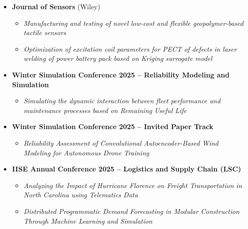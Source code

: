 \documentclass[10pt, letterpaper]{article}
\begin{document}
\begin{itemize}
    \item \textbf{Journal of Sensors} (Wiley)
    \begin{itemize}
        \item \textit{Manufacturing and testing of novel low-cost and flexible geopolymer-based tactile sensors}
        \item \textit{Optimization of excitation coil parameters for PECT of defects in laser welding of power battery pack based on Kriging surrogate model}
    \end{itemize}

    \item \textbf{Winter Simulation Conference 2025 – Reliability Modeling and Simulation}
    \begin{itemize}
        \item \textit{Simulating the dynamic interaction between fleet performance and maintenance processes based on Remaining Useful Life}
    \end{itemize}

    \item \textbf{Winter Simulation Conference 2025 – Invited Paper Track}
    \begin{itemize}
        \item \textit{Reliability Assessment of Convolutional Autoencoder-Based Wind Modeling for Autonomous Drone Training}
    \end{itemize}

    \item \textbf{IISE Annual Conference 2025 – Logistics and Supply Chain (LSC)}
    \begin{itemize}
        \item \textit{Analyzing the Impact of Hurricane Florence on Freight Transportation in North Carolina using Telematics Data}
        \item \textit{Distributed Programmatic Demand Forecasting in Modular Construction Through Machine Learning and Simulation}
    \end{itemize}


\end{itemize}
\end{document}
